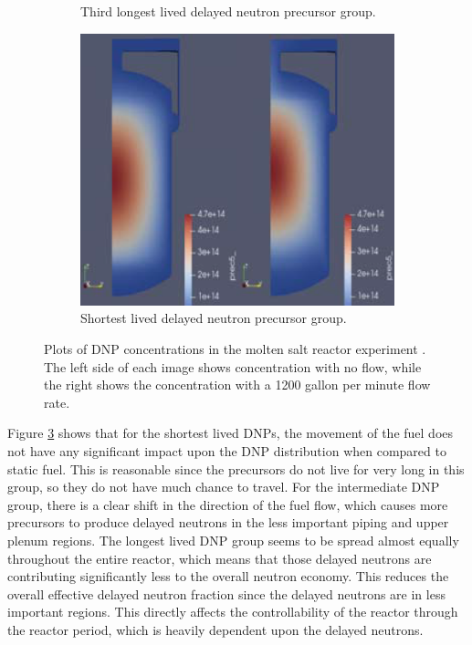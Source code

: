 \begin{figure}[H]
\begin{subfigure}{0.4\textwidth}
    \caption{Third longest lived delayed neutron precursor group.}
    \label{fig:second}
\end{subfigure}
\hfill
\centering
\begin{subfigure}{0.4\textwidth}
    \includegraphics[scale=0.25]{images/dnp6.PNG}
    \caption{Shortest lived delayed neutron precursor group.}
    \label{fig:third}
\end{subfigure}

\caption{Plots of DNP concentrations in the molten salt reactor experiment \cite{shi_gen-foam_2021}. The left side of each image shows concentration with no flow, while the right shows the concentration with a 1200 gallon per minute flow rate.}
\label{fig:genfoam_dnp_locations}
\end{figure}



Figure \ref{fig:genfoam_dnp_locations} shows that for the shortest lived DNPs, the movement of the fuel does not have any significant impact upon the DNP distribution when compared to static fuel. This is reasonable since the precursors do not live for very long in this group, so they do not have much chance to travel. For the intermediate DNP group, there is a clear shift in the direction of the fuel flow, which causes more precursors to produce delayed neutrons in the less important piping  and upper plenum regions. The longest lived DNP group seems to be spread almost equally throughout the entire reactor, which means that those delayed neutrons are contributing significantly less to the overall neutron economy. This reduces the overall effective delayed neutron fraction since the delayed neutrons are in less important regions. This directly affects the controllability of the reactor through the reactor period, which is heavily dependent upon the delayed neutrons.

